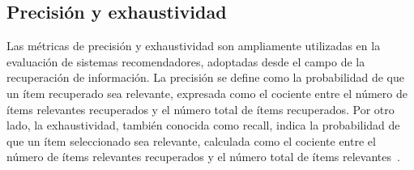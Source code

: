 \subsection{Precisión y exhaustividad}

\newcommand{\recall}[1]{recall@#1}
\newcommand{\precision}[1]{precision@#1}


Las métricas de precisión y exhaustividad son ampliamente utilizadas en la evaluación de sistemas recomendadores, adoptadas desde el campo de la recuperación de información. La precisión se define como la probabilidad de que un ítem recuperado sea relevante, expresada como el cociente entre el número de ítems relevantes recuperados y el número total de ítems recuperados. Por otro lado, la exhaustividad, también conocida como recall, indica la probabilidad de que un ítem seleccionado sea relevante, calculada como el cociente entre el número de ítems relevantes recuperados y el número total de ítems relevantes~\cite{herlocker_evaluating_2004}.

